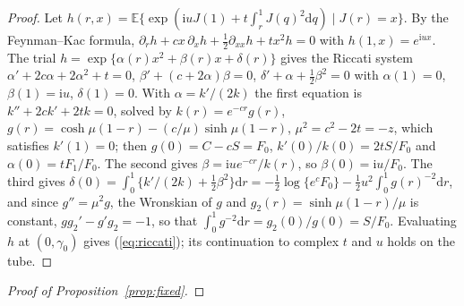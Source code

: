 \documentclass[ecta,nameyear,final]{econsocart}
\newcommand{\E}{{\mathbb E}}
\newcommand{\dr}[1]{{\mathrm d}#1}
\newcommand{\iu}{{\mathrm i}}
\theoremstyle{plain}
\theoremstyle{definition}
\begin{document}
\begin{appendix}
\begin{proof}
Let $h(r,x)=\E\{\exp(\iu uJ(1)+t\int_r^1J(q)^2\dr{q})\mid J(r)=x\}$.  By the Feynman--Kac formula, $\partial_rh+cx\,\partial_xh+\frac12\partial_{xx}h+tx^2h=0$ with $h(1,x)=e^{\iu ux}$.  The trial $h=\exp\{\alpha(r)x^2+\beta(r)x+\delta(r)\}$ gives the Riccati system $\alpha'+2c\alpha+2\alpha^2+t=0$, $\beta'+(c+2\alpha)\beta=0$, $\delta'+\alpha+\frac12\beta^2=0$ with $\alpha(1)=0$, $\beta(1)=\iu u$, $\delta(1)=0$.  With $\alpha=k'/(2k)$ the first equation is $k''+2ck'+2tk=0$, solved by $k(r)=e^{-cr}g(r)$, $g(r)=\cosh\mu(1-r)-(c/\mu)\sinh\mu(1-r)$, $\mu^2=c^2-2t=-z$, which satisfies $k'(1)=0$; then $g(0)=C-cS=F_0$, $k'(0)/k(0)=2tS/F_0$ and $\alpha(0)=tF_1/F_0$.  The second gives $\beta=\iu ue^{-cr}/k(r)$, so $\beta(0)=\iu u/F_0$.  The third gives $\delta(0)=\int_0^1\{k'/(2k)+\frac12\beta^2\}\dr{r}=-\frac12\log\{e^cF_0\}-\frac12u^2\int_0^1g(r)^{-2}\dr{r}$, and since $g''=\mu^2g$, the Wronskian of $g$ and $g_2(r)=\sinh\mu(1-r)/\mu$ is constant, $gg_2'-g'g_2=-1$, so that $\int_0^1g^{-2}\dr{r}=g_2(0)/g(0)=S/F_0$.  Evaluating $h$ at $(0,\gamma_0)$ gives (\ref{eq:riccati}); its continuation to complex $t$ and $u$ holds on the tube.
\end{proof}\begin{proof}[Proof of Proposition~\ref{prop:fixed}]

\end{proof}
\end{appendix}
\end{document}
